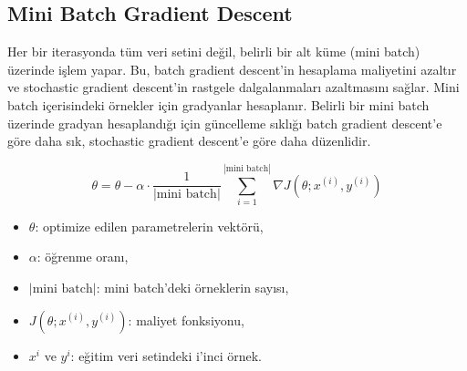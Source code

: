 \subsection{Mini Batch Gradient Descent}
Her bir iterasyonda tüm veri setini değil, belirli bir alt küme (mini batch) üzerinde işlem yapar. Bu, batch gradient descent'in hesaplama maliyetini azaltır ve stochastic gradient descent'in rastgele dalgalanmaları azaltmasını sağlar. Mini batch içerisindeki örnekler için gradyanlar hesaplanır. Belirli bir mini batch üzerinde gradyan hesaplandığı için güncelleme sıklığı batch gradient descent'e göre daha sık, stochastic gradient descent'e göre daha düzenlidir.

\[\theta = \theta - \alpha \cdot \frac{1}{|\text{mini batch}|} \sum_{i=1}^{|\text{mini batch}|} \nabla J(\theta;x^{(i)},y^{(i)})\]
\begin{itemize}
	\item $\theta$: optimize edilen parametrelerin vektörü,
	\item $\alpha$: öğrenme oranı,
	\item ${|\text{mini batch}|}$: mini batch'deki örneklerin sayısı,
	\item $J(\theta;x^{(i)},y^{(i)})$: maliyet fonksiyonu,
	\item $x^{i}$ ve $y^{i}$: eğitim veri setindeki i'inci örnek.
\end{itemize}

\newpage